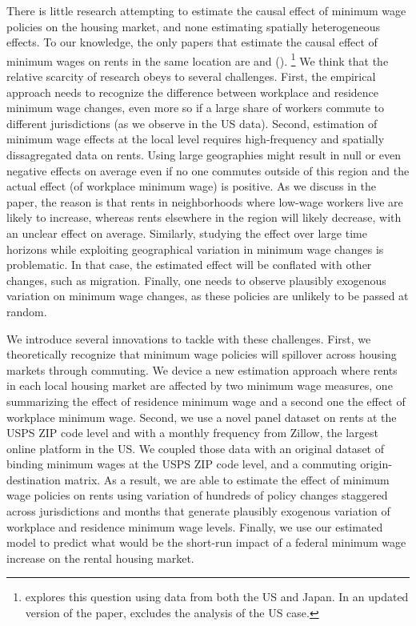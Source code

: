 
There is little research attempting to estimate the causal effect of minimum wage 
policies on the housing market, and none estimating spatially heterogeneous effects.
To our knowledge, the only papers that estimate the causal effect of minimum wages 
on rents in the same location are \textcite{Tidemann2018} and \citeauthor{Yamagishi2019} 
(\citeyear{Yamagishi2019, Yamagishi2021}).%
\footnote{\textcite{Yamagishi2019} explores this question using data from both the
US and Japan. In an updated version of the paper, \textcite{Yamagishi2021} excludes
the analysis of the US case.}
We think that the relative scarcity of research obeys to several challenges.
First, the empirical approach needs to recognize the difference between workplace
and residence minimum wage changes, even more so if a large share of workers
commute to different jurisdictions (as we observe in the US data).
Second, estimation of minimum wage effects at the local level requires high-frequency
and spatially dissagregated data on rents.
Using large geographies might result in null or even negative effects on average
even if no one commutes outside of this region and the actual effect (of workplace 
minimum wage) is positive.
As we discuss in the paper, the reason is that rents in neighborhoods where low-wage
workers live are likely to increase, whereas rents elsewhere in the region will 
likely decrease, with an unclear effect on average.
Similarly, studying the effect over large time horizons while exploiting geographical
variation in minimum wage changes is problematic.
In that case, the estimated effect will be conflated with other changes, such as
migration.
Finally, one needs to observe plausibly exogenous variation on minimum wage changes,
as these policies are unlikely to be passed at random.


We introduce several innovations to tackle with these challenges.
First, we theoretically recognize that minimum wage policies will spillover across
housing markets through commuting.
We device a new estimation approach where rents in each local housing market are 
affected by two minimum wage measures, one summarizing the effect of residence 
minimum wage and a second one the effect of workplace minimum wage.
Second, we use a novel panel dataset on rents at the USPS ZIP code level and with a
monthly frequency from Zillow, the largest online platform in the US.
We coupled those data with an original dataset of binding minimum wages at the USPS
ZIP code level, and a commuting origin-destination matrix.
As a result, we are able to estimate the effect of minimum wage policies on rents 
using variation of hundreds of policy changes staggered across jurisdictions and 
months that generate plausibly exogenous variation of workplace and residence minimum 
wage levels.
Finally, we use our estimated model to predict what would be the short-run impact
of a federal minimum wage increase on the rental housing market. 

